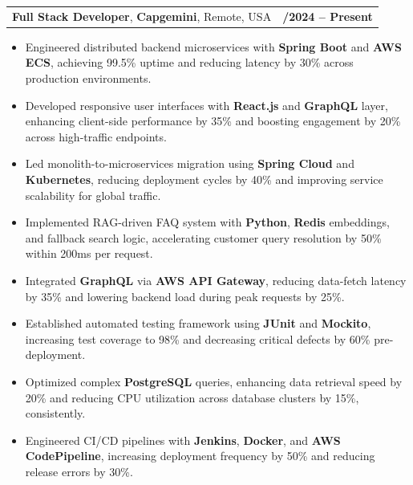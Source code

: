 \documentclass[letterpaper,11pt]{article}
\makeatletter
\newcommand{\resumeItem}[1]{
  \item\footnotesize{
    {#1 \vspace{-2pt}}
  }
}
\newcommand{\resumeSubheading}[4]{
  \vspace{-2pt}\item
    \begin{tabular*}{1.0\textwidth}[t]{l@{\extracolsep{\fill}}r}
      \textbf{\fontsize{10pt}{14pt}\selectfont #3}, \textbf{\fontsize{10pt}{14pt}\selectfont #1}, \fontsize{10pt}{14pt}\selectfont #4 & \textbf{\fontsize{10pt}{14pt}\selectfont #2} \\
    \end{tabular*}\vspace{-7pt}
}
\newcommand{\resumeItemListStart}{\begin{itemize}[leftmargin=*]}
\newcommand{\resumeItemListEnd}{\end{itemize}\vspace{-5pt}}
\makeatother
\begin{document}
    \resumeSubheading
        {Capgemini}{01/2024 -- Present}
        {Full Stack Developer}{Remote, USA}
      \resumeItemListStart
        \resumeItem{Engineered distributed backend microservices with \textbf{Spring Boot} and \textbf{AWS ECS}, achieving 99.5\% uptime and reducing latency by 30\% across production environments.}
        \resumeItem{Developed responsive user interfaces with \textbf{React.js} and \textbf{GraphQL} layer, enhancing client-side performance by 35\% and boosting engagement by 20\% across high-traffic endpoints.}
        \resumeItem{Led monolith-to-microservices migration using \textbf{Spring Cloud} and \textbf{Kubernetes}, reducing deployment cycles by 40\% and improving service scalability for global traffic.}
        \resumeItem{Implemented RAG-driven FAQ system with \textbf{Python}, \textbf{Redis} embeddings, and fallback search logic, accelerating customer query resolution by 50\% within 200ms per request.}
        \resumeItem{Integrated \textbf{GraphQL} via \textbf{AWS API Gateway}, reducing data-fetch latency by 35\% and lowering backend load during peak requests by 25\%.}
        \resumeItem{Established automated testing framework using \textbf{JUnit} and \textbf{Mockito}, increasing test coverage to 98\% and decreasing critical defects by 60\% pre-deployment.}
        \resumeItem{Optimized complex \textbf{PostgreSQL} queries, enhancing data retrieval speed by 20\% and reducing CPU utilization across database clusters by 15\%, consistently.}
        \resumeItem{Engineered CI/CD pipelines with \textbf{Jenkins}, \textbf{Docker}, and \textbf{AWS CodePipeline}, increasing deployment frequency by 50\% and reducing release errors by 30\%.}
      \resumeItemListEnd
\end{document}
